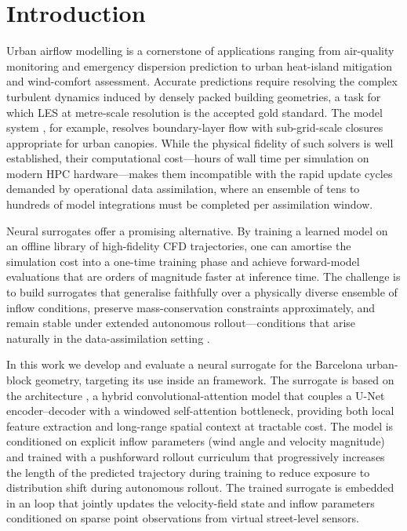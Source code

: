 \section{Introduction}
\label{sec:intro}

Urban airflow modelling is a cornerstone of applications ranging from air-quality
monitoring and emergency dispersion prediction to urban heat-island mitigation
and wind-comfort assessment. Accurate predictions require resolving the
complex turbulent dynamics induced by densely packed building geometries, a task
for which LES at metre-scale resolution is the accepted gold standard. The \palm{}
model system \cite{maronga2020}, for example, resolves boundary-layer flow with
sub-grid-scale closures appropriate for urban canopies. While the physical
fidelity of such solvers is well established, their computational cost---hours of
wall time per simulation on modern HPC hardware---makes them incompatible with
the rapid update cycles demanded by operational data assimilation, where an
ensemble of tens to hundreds of model integrations must be completed per
assimilation window.

Neural surrogates offer a promising alternative. By training a learned model on
an offline library of high-fidelity CFD trajectories, one can amortise the
simulation cost into a one-time training phase and achieve forward-model
evaluations that are orders of magnitude faster at inference time. The challenge
is to build surrogates that generalise faithfully over a physically diverse
ensemble of inflow conditions, preserve mass-conservation constraints
approximately, and remain stable under extended autonomous rollout---conditions
that arise naturally in the data-assimilation setting \cite{brandstetter2022}.

In this work we develop and evaluate a neural surrogate for the Barcelona
urban-block geometry, targeting its use inside an \esmda{} framework. The
surrogate is based on the \pthreed{} architecture \cite{holzschuh2025p3d}, a hybrid
convolutional-attention model that couples a U-Net encoder--decoder with a
windowed self-attention bottleneck, providing both local feature extraction
and long-range spatial context at tractable cost. The model is conditioned on
explicit inflow parameters (wind angle and velocity magnitude)
and trained with a pushforward rollout curriculum that progressively increases the
length of the predicted trajectory during training to reduce exposure to
distribution shift during autonomous rollout. The trained surrogate is embedded in
an \esmda{} loop that jointly updates the velocity-field state and inflow parameters
conditioned on sparse point observations from virtual street-level sensors.
